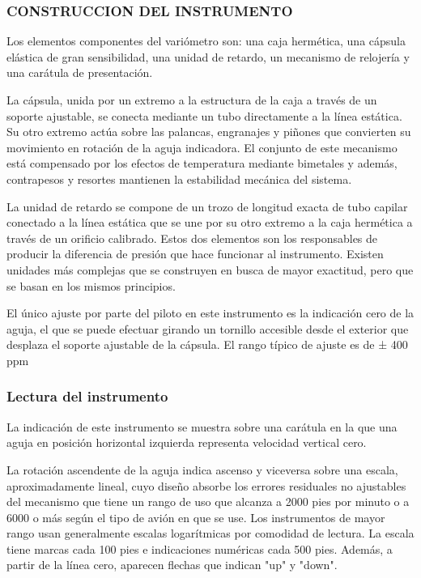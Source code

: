\documentclass{article}
\begin{document}
\subsubsection*{CONSTRUCCION DEL INSTRUMENTO}
Los elementos componentes del variómetro son: una caja hermética, una cápsula elástica de gran sensibilidad, una unidad de retardo, un mecanismo de relojería y una carátula de presentación.

La cápsula, unida por un extremo a la estructura de la caja a través de un soporte ajustable, se conecta mediante un tubo directamente a la línea estática. Su otro extremo actúa sobre las palancas, engranajes y piñones que convierten su movimiento en rotación de la aguja indicadora. El conjunto de este mecanismo está compensado por los efectos de temperatura mediante bimetales y además, contrapesos y resortes mantienen la estabilidad mecánica del sistema.

La unidad de retardo se compone de un trozo de longitud exacta de tubo capilar conectado a la línea estática que se une por su otro extremo a la caja hermética a través de un orificio calibrado. Estos dos elementos son los responsables de producir la diferencia de presión que hace funcionar al instrumento. Existen unidades más complejas que se construyen en busca de mayor exactitud, pero que se basan en los mismos principios.

El único ajuste por parte del piloto en este instrumento es la indicación cero de la aguja, el que se puede efectuar girando un tornillo accesible desde el exterior que desplaza el soporte ajustable de la cápsula. El rango típico de ajuste es de ± 400 ppm

\subsubsection*{Lectura del instrumento}
La indicación de este instrumento se muestra sobre una carátula en la que una aguja en posición horizontal izquierda representa velocidad vertical cero.

La rotación ascendente de la aguja indica ascenso y viceversa sobre una escala, aproximadamente lineal, cuyo diseño absorbe los errores residuales no ajustables del mecanismo que tiene un rango de uso que alcanza a 2000 pies por minuto o a 6000 o más según el tipo de avión en que se use. Los instrumentos de mayor rango usan generalmente escalas logarítmicas por comodidad de lectura.
La escala tiene marcas cada 100 pies e indicaciones numéricas cada 500 pies. Además, a partir de la línea cero, aparecen flechas que indican "up" y "down".
\end{document}
